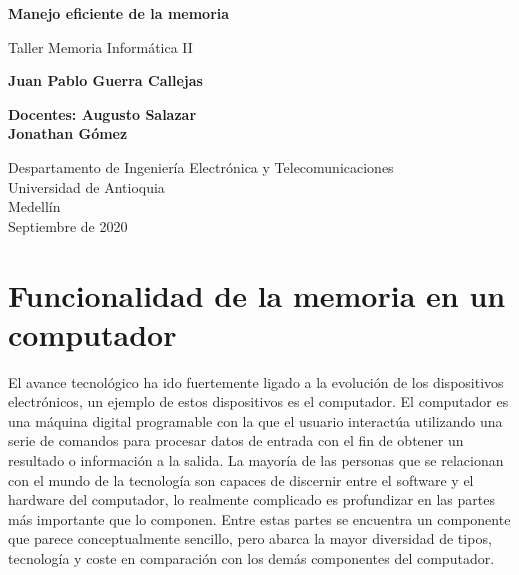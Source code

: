 \documentclass{article}
\begin{document}
\begin{titlepage}
    \begin{center}
        \vspace*{1cm}
            
        \Huge
        \textbf{Manejo eficiente de la memoria}
            
        \vspace{0.8 cm}
        \LARGE
        Taller Memoria Informática II
            
        \vspace{1.5cm}
            
        \textbf{Juan Pablo Guerra Callejas}
        
        \vspace{0.8 cm}
        
        \textbf{Docentes: Augusto Salazar\\
                Jonathan Gómez}
        \vfill
            
        \vspace{0.8cm}
            
        \Large
        Despartamento de Ingeniería Electrónica y Telecomunicaciones\\
        Universidad de Antioquia\\
        Medellín\\
        Septiembre de 2020
            
    \end{center}
\end{titlepage}

\tableofcontents
\newpage
\section{Funcionalidad de la memoria en un computador}\label{intro}

\noindent
El avance tecnológico ha ido fuertemente ligado a la evolución de los dispositivos electrónicos, un ejemplo de estos dispositivos es el computador. El computador es una máquina digital programable con la que el usuario interactúa utilizando una serie de comandos para procesar datos de entrada con el fin de obtener un resultado o información a la salida. La mayoría de las personas que se relacionan con el mundo de la tecnología son capaces de discernir entre el software y el hardware del computador, lo realmente complicado es profundizar en las partes más importante que lo componen. Entre estas partes se encuentra un componente que parece conceptualmente sencillo, pero abarca la mayor diversidad de tipos, tecnología y coste en comparación con los demás componentes del computador. \\
\end{document}
